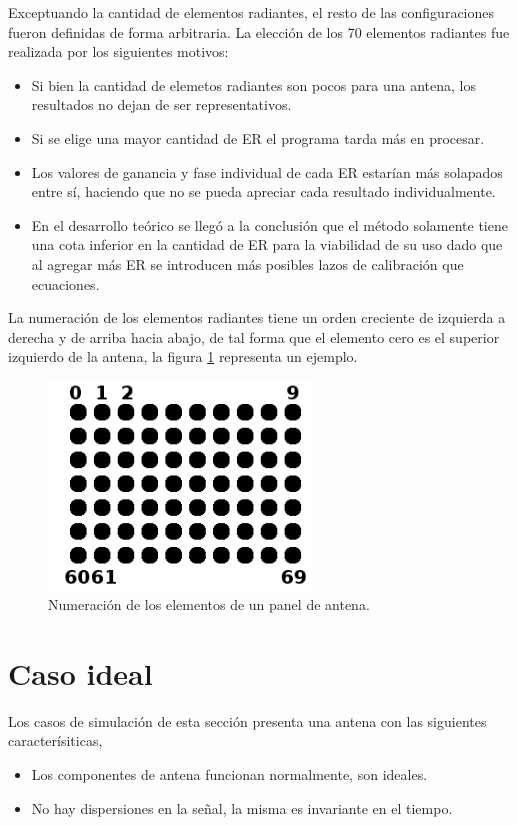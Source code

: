 Exceptuando la cantidad de elementos radiantes, el resto de las configuraciones fueron definidas de forma arbitraria. La
elección de los 70 elementos radiantes fue realizada por los siguientes motivos:
\begin{itemize}
	\item Si bien la cantidad de elemetos radiantes son pocos para una antena, los resultados no dejan de ser representativos.
	\item Si se elige una mayor cantidad de ER el programa tarda más en procesar. 
	\item Los valores de ganancia y fase individual de cada ER estarían más solapados entre sí, haciendo que no se pueda apreciar
		cada resultado individualmente. 
	\item En el desarrollo teórico se llegó a la conclusión que el método solamente tiene una cota inferior en la cantidad de ER
		para la viabilidad de su uso dado que al agregar más ER se introducen más posibles lazos de calibración que ecuaciones.
\end{itemize}

La numeración de los elementos radiantes tiene un orden creciente de izquierda a derecha y de arriba hacia abajo, de tal forma
que el elemento cero es el superior izquierdo de la antena, la figura \ref{fig:arrayNumeration} representa un ejemplo.

\begin{figure}[H]
 \centering
 \includegraphics[width=7cm]{gfx/arrayNumeration.png}
 \caption{Numeración de los elementos de un panel de antena.}
 \label{fig:arrayNumeration}
\end{figure}


\section{Caso ideal}
\label{sc:withoutDispersion} 

Los casos de simulación de esta sección presenta una antena con las siguientes caracterísiticas,
\begin{itemize}
	\item Los componentes de antena funcionan normalmente, son ideales.
	\item No hay dispersiones en la señal, la misma es invariante en el tiempo.
\end{itemize}


